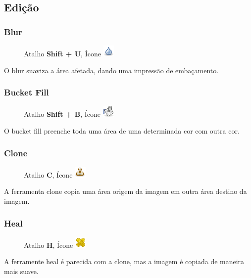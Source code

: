\documentclass[12pt,onecolumn]{article}
\begin{document}
            
      

  \subsection{Edição}
    \subsubsection{Blur}
      \begin{figure}[H]
        Atalho {\bf Shift + U}, Ícone
        \includegraphics{gimp-icons/stock-tool-blur-22.png}
        \label{fig:blur}
      \end{figure}
      O blur suaviza a área afetada, dando uma impressão de embaçamento.

  \subsubsection{Bucket Fill}
      \begin{figure}[H]
        Atalho {\bf Shift + B}, Ícone
        \includegraphics{gimp-icons/stock-tool-bucket-fill-22.png}
        \label{fig:bucket}
      \end{figure}
      O bucket fill preenche toda uma área de uma determinada cor com outra cor.
    
    \subsubsection{Clone}
      \begin{figure}[H]
        Atalho {\bf C}, Ícone
        \includegraphics{gimp-icons/stock-tool-clone-22.png}
        \label{fig:clone}
      \end{figure}
      A ferramenta clone copia uma área origem da imagem em outra área destino da imagem.
      
    \subsubsection{Heal}
      \begin{figure}[H]
        Atalho {\bf H}, Ícone
        \includegraphics{gimp-icons/stock-tool-heal-22.png}
        \label{fig:heal}
      \end{figure}
      A ferramente heal é parecida com a clone, mas a imagem é copiada de maneira mais suave.
\end{document}
